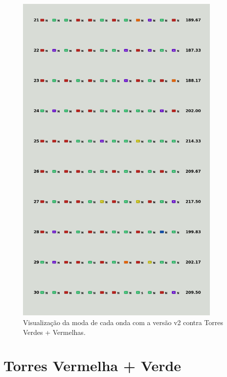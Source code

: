 \begin{figure}[H]
  \centering
  \includegraphics[width=0.9\textwidth]{figuras/td/td_greenred_ai_mode_2_3.png}
  \caption{Visualização da moda de cada onda com a versão v2 contra Torres Verdes + Vermelhas.}
  \label{fig:td-moda-greenred-2-3}
\end{figure}

\section{Torres Vermelha + Verde}
\label{sec:apend-moda-td-rg-v2}

